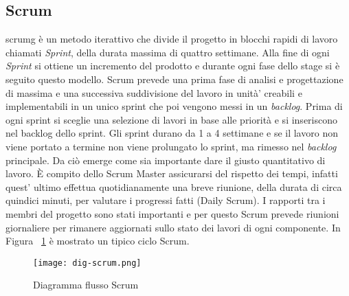 \subsection{Scrum}
\gls{scrumg} è un metodo iterattivo che divide il progetto in blocchi rapidi di lavoro chiamati
\textit{Sprint}, della durata massima di quattro settimane. Alla fine di ogni \textit{Sprint} si ottiene
un incremento del prodotto e durante ogni fase dello stage si è seguito questo modello. 
Scrum prevede una prima fase di analisi e progettazione di massima e una successiva suddivisione del lavoro in unità’ creabili e implementabili in un unico sprint che poi vengono messi in un \textit{backlog}. Prima di ogni sprint si sceglie una selezione di lavori in base alle priorità e si inseriscono nel backlog dello sprint. Gli sprint durano da 1 a 4 settimane e se il lavoro non viene portato a termine non viene prolungato lo sprint, ma rimesso nel \textit{backlog} principale. Da ciò emerge come sia importante dare il giusto quantitativo di lavoro. È compito dello
Scrum Master assicurarsi del rispetto dei tempi, infatti quest' ultimo effettua quotidianamente una breve
riunione, della durata di circa quindici minuti, per valutare i progressi fatti (Daily
Scrum). I rapporti tra i membri del progetto sono stati importanti e per questo Scrum prevede riunioni giornaliere per rimanere aggiornati sullo stato dei lavori di ogni componente.
In Figura ~\ref{fig:scrum} è mostrato un tipico ciclo Scrum.
\begin{figure}[!h]   
    \centering
    \texttt{[image: dig-scrum.png]} 
    \caption{Diagramma flusso Scrum}
    \label{fig:scrum} 
\end{figure}